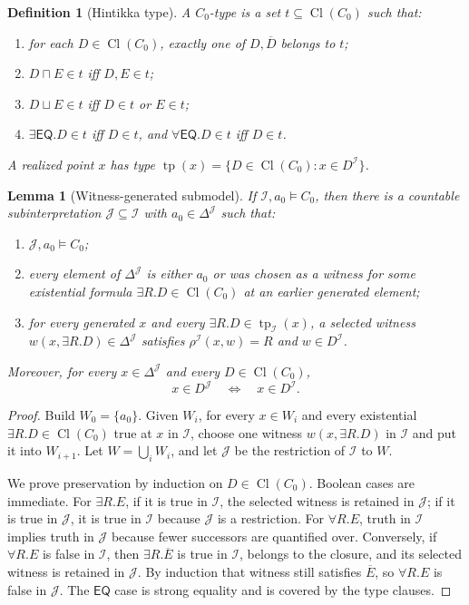 \documentclass[11pt]{article}
\newtheorem{lemma}[theorem]{Lemma}
\newtheorem{definition}[theorem]{Definition}
\newcommand{\Cl}{\operatorname{Cl}}
\newcommand{\EQ}{\mathsf{EQ}}
\newcommand{\I}{\mathcal I}
\newcommand{\J}{\mathcal J}
\newcommand{\typ}{\operatorname{tp}}
\begin{document}
\begin{definition}[Hintikka type]
A \(C_0\)-type is a set \(t\subseteq\Cl(C_0)\) such that:
\begin{enumerate}[label=(T\arabic*)]
\item for each \(D\in\Cl(C_0)\), exactly one of \(D,\overline D\) belongs to \(t\);
\item \(D\sqcap E\in t\) iff \(D,E\in t\);
\item \(D\sqcup E\in t\) iff \(D\in t\) or \(E\in t\);
\item \(\exists\EQ.D\in t\) iff \(D\in t\), and \(\forall\EQ.D\in t\) iff \(D\in t\).
\end{enumerate}
A realized point \(x\) has type \(\typ(x)=\{D\in\Cl(C_0):x\in D^\I\}\).
\end{definition}

\begin{lemma}[Witness-generated submodel]\label{lem:thinning}
If \(\I,a_0\models C_0\), then there is a countable subinterpretation \(\J\subseteq\I\) with \(a_0\in\Delta^\J\) such that:
\begin{enumerate}[label=(W\arabic*)]
\item \(\J,a_0\models C_0\);
\item every element of \(\Delta^\J\) is either \(a_0\) or was chosen as a witness for some existential formula \(\exists R.D\in\Cl(C_0)\) at an earlier generated element;
\item for every generated \(x\) and every \(\exists R.D\in\typ_\I(x)\), a selected witness \(w(x,\exists R.D)\in\Delta^\J\) satisfies \(\rho^\I(x,w)=R\) and \(w\in D^\I\).
\end{enumerate}
Moreover, for every \(x\in\Delta^\J\) and every \(D\in\Cl(C_0)\),
\[
  x\in D^\J \quad\Longleftrightarrow\quad x\in D^\I .
\]
\end{lemma}

\begin{proof}
Build \(W_0=\{a_0\}\).  Given \(W_i\), for every \(x\in W_i\) and every existential \(\exists R.D\in\Cl(C_0)\) true at \(x\) in \(\I\), choose one witness \(w(x,\exists R.D)\) in \(\I\) and put it into \(W_{i+1}\).  Let \(W=\bigcup_i W_i\), and let \(\J\) be the restriction of \(\I\) to \(W\).

We prove preservation by induction on \(D\in\Cl(C_0)\).  Boolean cases are immediate.  For \(\exists R.E\), if it is true in \(\I\), the selected witness is retained in \(\J\); if it is true in \(\J\), it is true in \(\I\) because \(\J\) is a restriction.  For \(\forall R.E\), truth in \(\I\) implies truth in \(\J\) because fewer successors are quantified over.  Conversely, if \(\forall R.E\) is false in \(\I\), then \(\exists R.\overline E\) is true in \(\I\), belongs to the closure, and its selected witness is retained in \(\J\).  By induction that witness still satisfies \(\overline E\), so \(\forall R.E\) is false in \(\J\).  The \(\EQ\) case is strong equality and is covered by the type clauses.
\end{proof}
\end{document}

